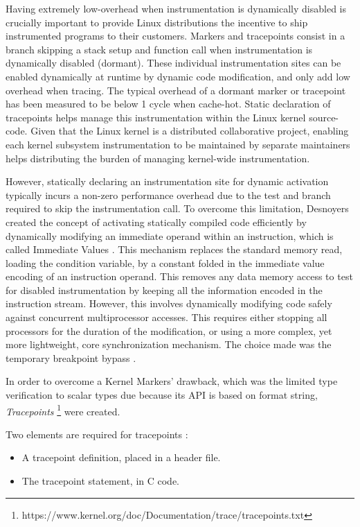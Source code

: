 Having extremely low-overhead when instrumentation is dynamically disabled is
crucially important to provide Linux distributions the incentive to ship
instrumented programs to their customers. Markers and tracepoints consist in a
branch skipping a stack setup and function call when instrumentation is
dynamically disabled (dormant). These individual instrumentation sites can be
enabled dynamically at runtime by dynamic code modification, and only add low
overhead when tracing. The typical overhead of a dormant marker or tracepoint
has been measured to be below 1 cycle \cite{marker-perf} when cache-hot. Static
declaration of tracepoints helps manage this instrumentation within the Linux
kernel source-code. Given that the Linux kernel is a distributed collaborative
project, enabling each kernel subsystem instrumentation to be maintained by
separate maintainers helps distributing the burden of managing kernel-wide
instrumentation.  

However, statically declaring an instrumentation site for dynamic activation
typically incurs a non-zero performance overhead due to the test and branch
required to skip the instrumentation call. To overcome this limitation,
Desnoyers created the concept of activating statically compiled code
efficiently by dynamically modifying an immediate operand within an
instruction, which is called Immediate Values \cite{marker-perf}. This
mechanism replaces the standard memory read, loading the condition variable, by
a constant folded in the immediate value encoding of an instruction operand.
This removes any data memory access to test for disabled instrumentation by
keeping all the information encoded in the instruction stream. However, this
involves dynamically modifying code safely against concurrent multiprocessor
accesses. This requires either stopping all processors for the duration of the
modification, or using a more complex, yet more lightweight, core
synchronization mechanism. The choice made was the temporary breakpoint bypass
\cite{bp-bypass}.

In order to overcome a Kernel Markers' drawback, which was the limited type
verification to scalar types due because its API is based on format string,
\textit{Tracepoints}
\footnote{https://www.kernel.org/doc/Documentation/trace/tracepoints.txt} were
created.

Two elements are required for tracepoints :
\begin{itemize}
\item A tracepoint definition, placed in a header file.
\item The tracepoint statement, in C code.
\end{itemize}

